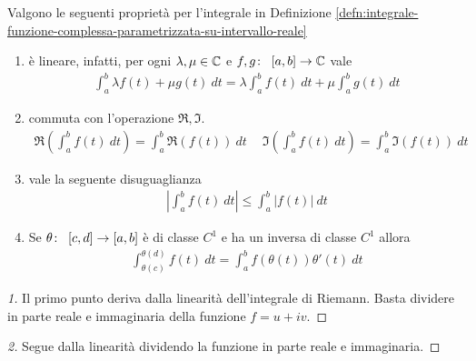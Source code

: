 \begin{proposition}
	\label{prop:proprieta-funzione-complessa-parametrizzata-su-intervallo-reale}
	Valgono le seguenti proprietà per l'integrale in Definizione \ref{defn:integrale-funzione-complessa-parametrizzata-su-intervallo-reale}
	\begin{enumerate}
		\item è lineare, infatti, per ogni $\lambda, \mu \in \mathbb{C}$ e $f,g \colon\ \left[a,b\right] \rightarrow \mathbb{C}$ vale
		\begin{equation*}
		\begin{aligned}
			\int_{a}^{b} \lambda f(t)  + \mu g(t)\ dt = \lambda \int_{a}^{b} f(t)\ dt + \mu \int_{a}^{b} g(t)\ dt   
		\end{aligned}
		\end{equation*}
		\item commuta con l'operazione $\Re, \Im$.
		\begin{equation*}
		\begin{aligned}	
			\Re\left(\int_{a}^{b} f(t)\ dt\right) = \int_{a}^{b} \Re(f(t))\ dt \quad\ \Im\left(\int_{a}^{b} f(t)\ dt\right) = \int_{a}^{b} \Im(f(t))\ dt
		\end{aligned}
		\end{equation*} 
		\item vale la seguente disuguaglianza
		\begin{equation*}
		\begin{aligned}
			\left|\int_{a}^{b} f(t)\ dt\right| \le \int_{a}^{b} |f(t)|\ dt
		\end{aligned}
		\end{equation*}
		\item Se $\theta \colon\ \left[c,d\right] \rightarrow \left[a,b\right]$ è di classe $C^1$ e ha un inversa di classe $C^1$ allora
		\begin{equation*}
		\begin{aligned}
			\int_{\theta(c)}^{\theta(d)} f(t)\ dt = \int_{a}^{b} f(\theta(t))\theta'(t)\ dt
		\end{aligned}
		\end{equation*}
	\end{enumerate} 
\end{proposition}
\begin{proof}[1]
	Il primo punto deriva dalla linearità dell'integrale di Riemann. 
	Basta dividere in parte reale e immaginaria della funzione $f = u+ iv$.
\end{proof}

\begin{proof}[2]
	Segue dalla linearità dividendo la funzione in parte reale e immaginaria.	
\end{proof}


